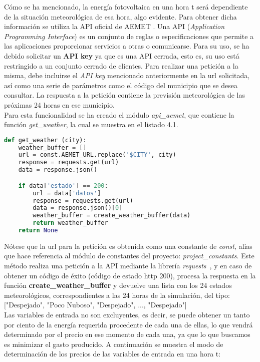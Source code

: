 Cómo se ha mencionado, la energía fotovoltaica en una hora t será dependiente de la situación meteorológica de esa hora, algo evidente. Para obtener dicha información se utiliza la API oficial de AEMET \cite{Aemet}. Una API (\textit{Application Programming Interface}) es un conjunto de reglas o especificaciones que permite a las aplicaciones proporcionar servicios a otras o comunicarse. Para su uso, se ha debido solicitar un \textbf{API key} ya que es una API cerrada, esto es, su uso está restringido a un conjunto cerrado de clientes. Para realizar una petición a la misma, debe incluirse el \textit{API key} mencionado anteriormente en la url solicitada, así como una serie de parámetros como el código del municipio que se desea consultar. La respuesta a la petición contiene la previsión meteorológica de las próximas 24 horas en ese municipio.\\Para esta funcionalidad se ha creado el módulo \textit{api\_aemet}, que contiene la función \textit{get\_weather}, la cual se muestra en el listado 4.1.
\begin{lstlisting}[language=Python,float=ht,caption={Función para obtener los valores meteorológicos}]
def get_weather (city):
    weather_buffer = []
    url = const.AEMET_URL.replace('$CITY', city)
    response = requests.get(url)
    data = response.json()

    if data['estado'] == 200:
        url = data['datos']
        response = requests.get(url)
        data = response.json()[0]
        weather_buffer = create_weather_buffer(data)
        return weather_buffer
    return None
\end{lstlisting}
 Nótese que la url para la petición es obtenida como una constante de \textit{const}, alias que hace referencia al módulo de constantes del proyecto: \textit{project\_constants}. Este método realiza una petición a la API mediante la librería \textit{requests}~\cite{Kenn11}, y en caso de obtener un código de éxito (código de estado http 200), procesa la respuesta en la función \textbf{create\_weather\_buffer} y devuelve una lista con los 24 estados meteorológicos, correspondientes a las 24 horas de la simulación, del tipo: ["Despejado", "Poco Nuboso", "Despejado", ..., "Despejado"]\\

Las variables de entrada no son excluyentes, es decir, se puede obtener un tanto por ciento de la energía requerida procedente de cada una de ellas, lo que vendrá determinado por el precio en ese momento de cada una, ya que lo que buscamos es minimizar el gasto producido. A continuación se muestra el modo de determinación de los precios de las variables de entrada en una hora t: \\

